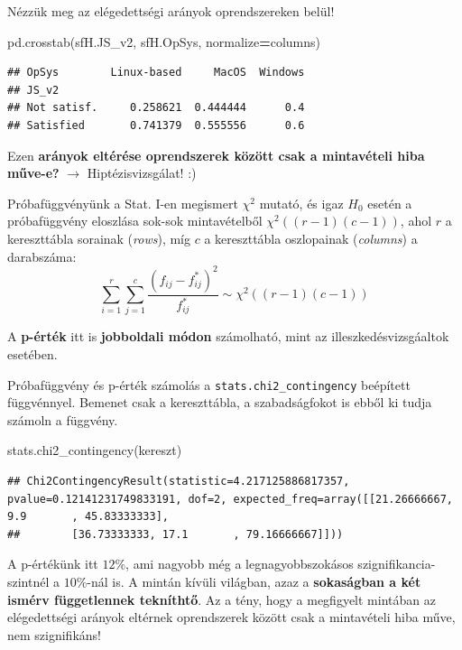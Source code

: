 \documentclass[
]{book}
\newenvironment{Shaded}{\begin{snugshade}}{\end{snugshade}}
\newcommand{\NormalTok}[1]{#1}
\newcommand{\OperatorTok}[1]{\textcolor[rgb]{0.81,0.36,0.00}{\textbf{#1}}}
\newcommand{\StringTok}[1]{\textcolor[rgb]{0.31,0.60,0.02}{#1}}
\begin{document}
Nézzük meg az elégedettségi arányok oprendszereken belül!

\begin{Shaded}
\begin{Highlighting}[]
\NormalTok{pd.crosstab(sfH.JS\_v2, sfH.OpSys, normalize}\OperatorTok{=}\StringTok{\textquotesingle{}columns\textquotesingle{}}\NormalTok{)}
\end{Highlighting}
\end{Shaded}

\begin{verbatim}
## OpSys        Linux-based     MacOS  Windows
## JS_v2                                      
## Not satisf.     0.258621  0.444444      0.4
## Satisfied       0.741379  0.555556      0.6
\end{verbatim}

Ezen \textbf{arányok eltérése oprendszerek között csak a mintavételi hiba műve-e?} \(\rightarrow\) Hiptézisvizsgálat! :)

Próbafüggvényünk a Stat. I-en megismert \(\chi^2\) mutató, és igaz \(H_0\) esetén a próbafüggvény eloszlása sok-sok mintavételből \(\chi^2((r-1)(c-1))\), ahol \(r\) a kereszttábla sorainak (\emph{rows}), míg \(c\) a kereszttábla oszlopainak (\emph{columns}) a darabszáma: \[\sum_{i=1}^{r}\sum_{j=1}^{c}\frac{(f_{ij}-f^*_{ij})^2}{f^*_{ij}}\sim\chi^2((r-1)(c-1))\]

A \textbf{p-érték} itt is \textbf{jobboldali módon} számolható, mint az illeszkedésvizsgáaltok esetében.

Próbafüggvény és p-érték számolás a \texttt{stats.chi2\_contingency} beépített függvénnyel. Bemenet csak a kereszttábla, a szabadságfokot is ebből ki tudja számoln a függvény.

\begin{Shaded}
\begin{Highlighting}[]
\NormalTok{stats.chi2\_contingency(kereszt)}
\end{Highlighting}
\end{Shaded}

\begin{verbatim}
## Chi2ContingencyResult(statistic=4.217125886817357, pvalue=0.12141231749833191, dof=2, expected_freq=array([[21.26666667,  9.9       , 45.83333333],
##        [36.73333333, 17.1       , 79.16666667]]))
\end{verbatim}

A p-értékünk itt \(12\%\), ami nagyobb még a legnagyobbszokásos szignifikancia-szintnél a \(10\%\)-nál is. A mintán kívüli világban, azaz a \textbf{sokaságban a két ismérv függetlennek tekníthtő}.
Az a tény, hogy a megfigyelt mintában az elégedettségi arányok eltérnek oprendszerek között csak a mintavételi hiba műve, nem szignifikáns!
\end{document}
